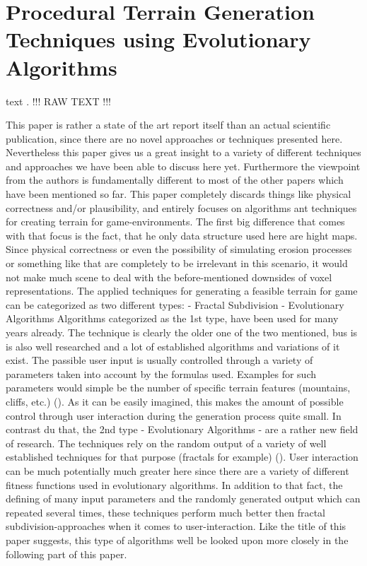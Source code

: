 \section{Procedural Terrain Generation Techniques using Evolutionary Algorithms}

text \cite{raffe2012survey}.
!!! RAW TEXT !!!

This paper is rather a state of the art report itself than an actual scientific publication, since there are no novel approaches or techniques presented here. Nevertheless this paper gives us a great insight to a variety of different techniques and approaches we have been able to discuss here yet. Furthermore the viewpoint from the authors is fundamentally different to most of the other papers which have been mentioned so far.
This paper completely discards things like physical correctness and/or plausibility, and entirely focuses on algorithms ant techniques for creating terrain for game-environments. The first big difference that comes with that focus is the fact, that he only data structure used here are hight maps. Since physical correctness or even the possibility of simulating erosion processes or something like that are completely to be irrelevant in this scenario, it would not make much scene to deal with the before-mentioned downsides of voxel representations.
The applied techniques for generating a feasible terrain for game can be categorized as two different types:
- Fractal Subdivision
- Evolutionary Algorithms
Algorithms categorized as the 1st type, have been used for many years already. The technique is clearly the older one of the two mentioned, bus is is also well researched and a lot of established algorithms and variations of it exist. The passible user input is usually controlled through a variety of parameters taken into account by the formulas used. Examples for such parameters would simple be the number of specific terrain features (mountains, cliffs, etc.) (). As it can be easily imagined, this makes the amount of possible control through user interaction during the generation process quite small.
In contrast du that, the 2nd type - Evolutionary Algorithms - are a rather new field of research. The techniques rely on the random output of a variety of well established techniques for that purpose (fractals for example) (). User interaction can be much potentially much greater here since there are a variety of different fitness functions used in evolutionary algorithms. In addition to that fact, the defining of many input parameters and the randomly generated output which can repeated several times, these techniques perform much better then fractal subdivision-approaches when it comes to user-interaction. Like the title of this paper suggests, this type of algorithms well be looked upon more closely in the following part of this paper.
